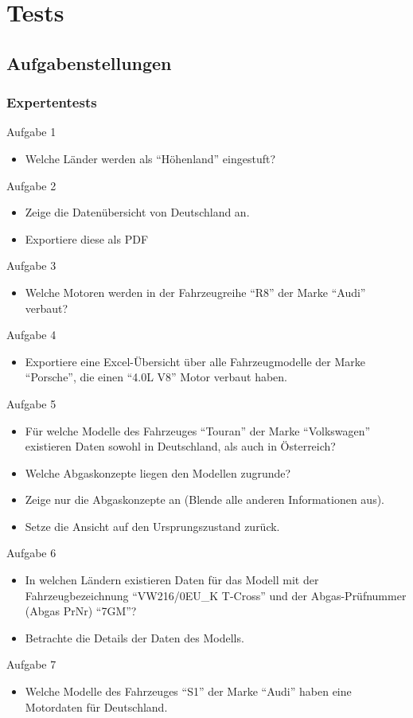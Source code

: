 \chapter{Tests}
\section{Aufgabenstellungen}
\subsection{Expertentests} \label{sec:tasksExpert}
Aufgabe 1
\begin{itemize}
	\item Welche Länder werden als \enquote{Höhenland} eingestuft?
\end{itemize}
Aufgabe 2
\begin{itemize}
	\item Zeige die Datenübersicht von Deutschland an.
	\item Exportiere diese als PDF
\end{itemize}
Aufgabe 3
\begin{itemize}
	\item Welche Motoren werden in der Fahrzeugreihe \enquote{R8} der Marke \enquote{Audi} verbaut?
\end{itemize}
Aufgabe 4
\begin{itemize}
	\item Exportiere eine Excel-Übersicht über alle Fahrzeugmodelle der Marke \enquote{Porsche}, die einen \enquote{4.0L V8} Motor verbaut haben.
\end{itemize}
Aufgabe 5
\begin{itemize}
	\item Für welche Modelle des Fahrzeuges \enquote{Touran} der Marke \enquote{Volkswagen} existieren Daten sowohl in Deutschland, als auch in Österreich?
	\item Welche Abgaskonzepte liegen den Modellen zugrunde?
	\item Zeige nur die Abgaskonzepte an (Blende alle anderen Informationen aus).
	\item Setze die Ansicht auf den Ursprungszustand zurück.
\end{itemize}
Aufgabe 6
\begin{itemize}
	\item In welchen Ländern existieren Daten für das Modell mit der Fahrzeugbezeichnung \enquote{VW216/0EU\_{}K T-Cross} und der Abgas-Prüfnummer (Abgas PrNr) \enquote{7GM}?
	\item Betrachte die Details der Daten des Modells.
\end{itemize}
Aufgabe 7
\begin{itemize}
	\item Welche Modelle des Fahrzeuges \enquote{S1} der Marke \enquote{Audi} haben eine Motordaten für Deutschland.
\end{itemize}
